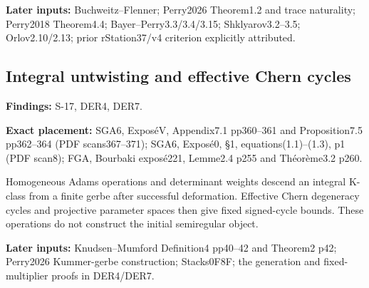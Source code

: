 \documentclass[11pt,a4paper]{article}
\theoremstyle{definition}
\begin{document}
\textbf{Later inputs:} Buchweitz--Flenner; Perry2026 Theorem1.2 and
trace naturality; Perry2018 Theorem4.4; Bayer--Perry3.3/3.4/3.15;
Shklyarov3.2--3.5; Orlov2.10/2.13; prior rStation37/v4 criterion
explicitly attributed.

\subsection{Integral untwisting and effective Chern
cycles}\label{FRAMEWORK-integral-untwisting-and-effective-chern-cycles}

\textbf{Findings:} S-17, DER4, DER7.

\textbf{Exact placement:} SGA6, ExposéV, Appendix7.1 pp360--361 and
Proposition7.5 pp362--364 (PDF scans367--371); SGA6, Exposé0, §1,
equations(1.1)--(1.3), p1 (PDF scan8); FGA, Bourbaki exposé221, Lemme2.4
p255 and Théorème3.2 p260.

Homogeneous Adams operations and determinant weights descend an integral
K-class from a finite gerbe after successful deformation. Effective
Chern degeneracy cycles and projective parameter spaces then give fixed
signed-cycle bounds. These operations do not construct the initial
semiregular object.

\textbf{Later inputs:} Knudsen--Mumford Definition4 pp40--42 and
Theorem2 p42; Perry2026 Kummer-gerbe construction; Stacks0F8F; the
generation and fixed-multiplier proofs in DER4/DER7.
\end{document}

